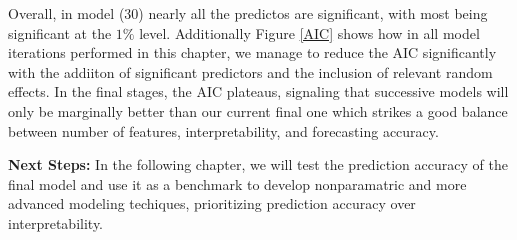 Overall, in model (30) nearly all the predictos are significant, with most being significant at the $1\%$ level. Additionally Figure \ref{AIC} shows how in all model iterations performed in this chapter, we manage to reduce the AIC significantly with the addiiton of significant predictors and the inclusion of relevant random effects. In the final stages, the AIC plateaus, signaling that successive models will only be marginally better than our current final one which strikes a good balance between number of features, interpretability, and forecasting accuracy.


\textbf{Next Steps:} In the following chapter, we will test the prediction accuracy of the final model and use it as a benchmark to develop nonparamatric and more advanced modeling techiques, prioritizing prediction accuracy over interpretability.
